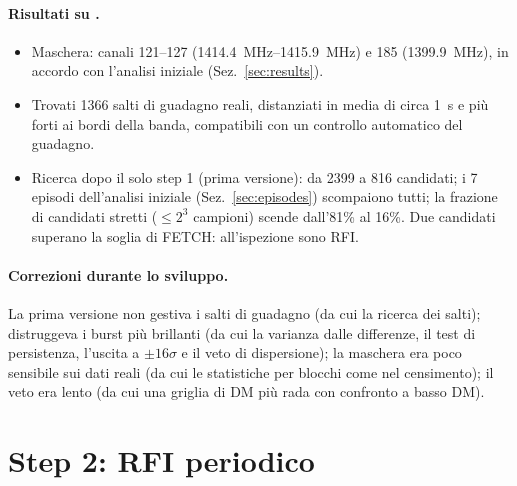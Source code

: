 \paragraph{Risultati su .}
\begin{itemize}
  \item Maschera: canali 121--127 (\SIrange{1414.4}{1415.9}{\mega\hertz}) e 185 (\SI{1399.9}{\mega\hertz}), in accordo
    con l'analisi iniziale (Sez.~\ref{sec:results}).
  \item Trovati 1366 salti di guadagno reali, distanziati in media di circa \SI{1}{\second} e più forti ai bordi della
    banda, compatibili con un controllo automatico del guadagno. 
  \item Ricerca dopo il solo step 1 (prima versione): da 2399 a 816 candidati; i 7 episodi dell'analisi iniziale
    (Sez.~\ref{sec:episodes}) scompaiono tutti; la frazione di candidati stretti ($\leq2^3$ campioni) scende dall'81\%
    al 16\%. Due candidati superano la soglia di FETCH: all'ispezione sono RFI.
\end{itemize}

\paragraph{Correzioni durante lo sviluppo.} La prima versione non gestiva i salti di guadagno (da cui la ricerca dei
salti); distruggeva i burst più brillanti (da cui la varianza dalle differenze, il test di persistenza, l'uscita a
$\pm16\sigma$ e il veto di dispersione); la maschera era poco sensibile sui dati reali (da cui le statistiche per
blocchi come nel censimento); il veto era lento (da cui una griglia di DM più rada con confronto a basso DM).

\FloatBarrier
\section{Step 2: RFI periodico}
\label{sec:step2}

